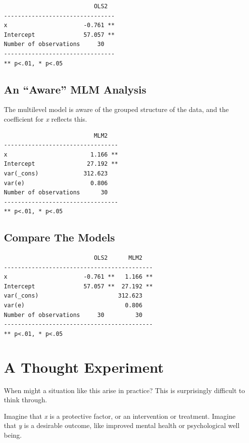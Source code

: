 \documentclass[
  letterpaper,
  DIV=11,
  numbers=noendperiod]{scrreprt}
\begin{document}
\begin{verbatim}
                          OLS2  
--------------------------------
x                      -0.761 **
Intercept              57.057 **
Number of observations     30   
--------------------------------
** p<.01, * p<.05
\end{verbatim}

\subsection{An ``Aware'' MLM Analysis}\label{an-aware-mlm-analysis}

The multilevel model is aware of the grouped structure of the data, and
the coefficient for \emph{x} reflects this.

\begin{verbatim}
                          MLM2   
---------------------------------
x                        1.166 **
Intercept               27.192 **
var(_cons)             312.623   
var(e)                   0.806   
Number of observations      30   
---------------------------------
** p<.01, * p<.05
\end{verbatim}

\subsection{Compare The Models}\label{compare-the-models}

\begin{verbatim}
                          OLS2      MLM2   
-------------------------------------------
x                      -0.761 **   1.166 **
Intercept              57.057 **  27.192 **
var(_cons)                       312.623   
var(e)                             0.806   
Number of observations     30         30   
-------------------------------------------
** p<.01, * p<.05
\end{verbatim}

\section{A Thought Experiment}\label{a-thought-experiment}

When might a situation like this arise in practice? This is surprisingly
difficult to think through.

Imagine that \emph{x} is a protective factor, or an intervention or
treatment. Imagine that \emph{y} is a desirable outcome, like improved
mental health or psychological well being.
\end{document}
